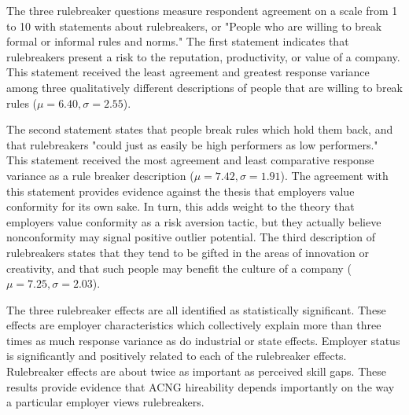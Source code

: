 \documentclass[review]{elsarticle}
\begin{document}
The three rulebreaker questions measure respondent agreement on a scale from 1 to 10 with statements about rulebreakers, or "People who are willing to break formal or informal rules and norms."
The first statement indicates that rulebreakers present a risk to the reputation, productivity, or value of a company.
This statement received the least agreement and greatest response variance among three qualitatively different descriptions of people that are willing to break rules ($\mu = 6.40, \sigma = 2.55$).

The second statement states that people break rules which hold them back, and that rulebreakers "could just as easily be high performers as low performers."
This statement received the most agreement and least comparative response variance as a rule breaker description ($\mu = 7.42, \sigma = 1.91$).
The agreement with this statement provides evidence against the thesis that employers value conformity for its own sake.
In turn, this adds weight to the theory that employers value conformity as a risk aversion tactic, but they actually believe nonconformity may signal positive outlier potential.
The third description of rulebreakers states that they tend to be gifted in the areas of innovation or creativity, and that such people may benefit the culture of a company ($\mu = 7.25, \sigma = 2.03$).

The three rulebreaker effects are all identified as statistically significant.
These effects are employer characteristics which collectively explain more than three times as much response variance as do industrial or state effects.
Employer status is significantly and positively related to each of the rulebreaker effects.
Rulebreaker effects are about twice as important as perceived skill gaps.
These results provide evidence that ACNG hireability depends importantly on the way a particular employer views rulebreakers.
\end{document}

